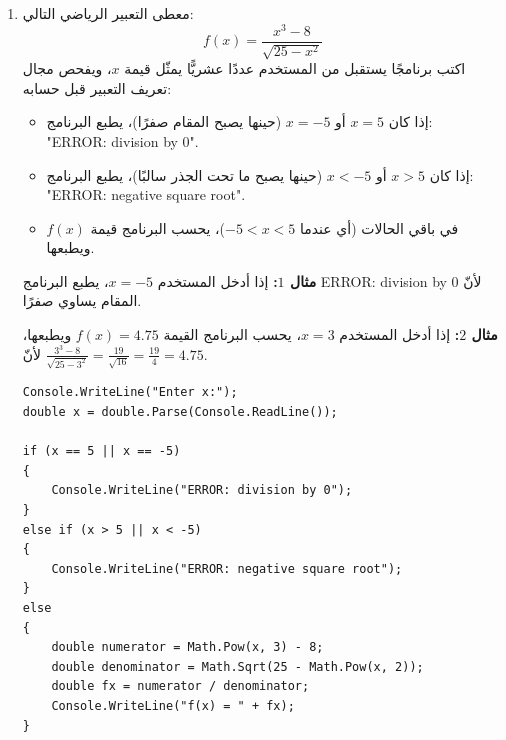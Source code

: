 \documentclass[14pt]{extarticle}
\begin{document}
\begin{enumerate}[resume, itemsep=2.2em]
\item
معطى التعبير الرياضي التالي:
\[ f(x) = \frac{x^3 - 8}{\sqrt{25 - x^2}} \]
اكتب برنامجًا يستقبل من المستخدم عددًا عشريًّا يمثّل قيمة $x$، ويفحص مجال تعريف التعبير قبل حسابه:
\begin{itemize}[nosep]
    \item إذا كان $x = 5$ أو $x = -5$ (حينها يصبح المقام صفرًا)، يطبع البرنامج: \\
    \textenglish{"ERROR: division by 0"}.
    \item إذا كان $x > 5$ أو $x < -5$ (حينها يصبح ما تحت الجذر سالبًا)، يطبع البرنامج: \\
    \textenglish{"ERROR: negative square root"}.
    \item في باقي الحالات (أي عندما $-5 < x < 5$)، يحسب البرنامج قيمة $f(x)$ ويطبعها.
\end{itemize}

\textbf{مثال $1$:} إذا أدخل المستخدم $x = -5$، يطبع البرنامج \textenglish{ERROR: division by 0} لأنّ المقام يساوي صفرًا.

\textbf{مثال $2$:} إذا أدخل المستخدم $x = 3$، يحسب البرنامج القيمة $f(x) = 4.75$ ويطبعها، لأنّ $\frac{3^3 - 8}{\sqrt{25 - 3^2}} = \frac{19}{\sqrt{16}} = \frac{19}{4} = 4.75$.

\ifwithsols
\begin{boxSolution}
\begin{english}
\begin{verbatim}
Console.WriteLine("Enter x:");
double x = double.Parse(Console.ReadLine());

if (x == 5 || x == -5)
{
    Console.WriteLine("ERROR: division by 0");
}
else if (x > 5 || x < -5)
{
    Console.WriteLine("ERROR: negative square root");
}
else
{
    double numerator = Math.Pow(x, 3) - 8;
    double denominator = Math.Sqrt(25 - Math.Pow(x, 2));
    double fx = numerator / denominator;
    Console.WriteLine("f(x) = " + fx);
}
\end{verbatim}
\end{english}
\end{boxSolution}
\fi
\filbreak


\end{enumerate}
\end{document}
